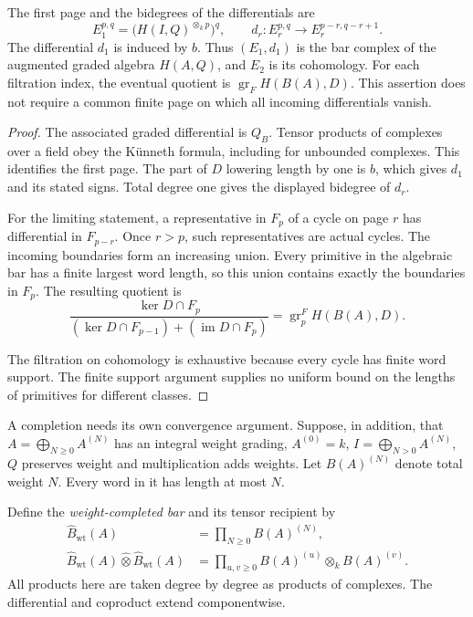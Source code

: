 \begin{proposition}
\label{prop:brst-length-sequence}
The first page and the bidegrees of the differentials are
\[
 E_1^{p,q}=\bigl(H(I,Q)^{\otimes_k p}\bigr)^q,
 \qquad
 d_r:E_r^{p,q}\longrightarrow E_r^{p-r,q-r+1}.
\]
The differential $d_1$ is induced by $b$.
Thus $(E_1,d_1)$ is the bar complex of the augmented graded algebra
$H(A,Q)$, and $E_2$ is its cohomology.
For each filtration index, the eventual quotient is
$\operatorname{gr}_F H(B(A),D)$.
This assertion does not require a common finite page on which
all incoming differentials vanish.
\end{proposition}
\begin{proof}
The associated graded differential is $Q_B$.
Tensor products of complexes over a field obey the K\"unneth
formula, including for unbounded complexes.
This identifies the first page.  The part of $D$ lowering length
by one is $b$, which gives $d_1$ and its stated signs.
Total degree one gives the displayed bidegree of $d_r$.

For the limiting statement, a representative in $F_p$ of a cycle
on page $r$ has differential in $F_{p-r}$.
Once $r>p$, such representatives are actual cycles.
The incoming boundaries form an increasing union.
Every primitive in the algebraic bar has a finite largest word
length, so this union contains exactly the boundaries in $F_p$.
The resulting quotient is
\[
 \frac{\ker D\cap F_p}
 { (\ker D\cap F_{p-1})+(\operatorname{im}D\cap F_p)}
 =\operatorname{gr}_p^F H(B(A),D).
\]

The filtration on cohomology is exhaustive because every cycle
has finite word support.
The finite support argument supplies no uniform bound on the
lengths of primitives for different classes.
\end{proof}

A completion needs its own convergence argument.
Suppose, in addition, that
$A=\bigoplus_{N\geq0}A^{(N)}$ has an integral weight grading,
$A^{(0)}=k$, $I=\bigoplus_{N>0}A^{(N)}$,
$Q$ preserves weight and multiplication adds weights.
Let $B(A)^{(N)}$ denote total weight $N$.
Every word in it has length at most $N$.

Define the \emph{weight-completed bar} and its tensor recipient by
\begin{align*}
 \widehat B_{\mathrm{wt}}(A)&=\prod_{N\geq0}B(A)^{(N)},\\
 \widehat B_{\mathrm{wt}}(A)\widehat\otimes
 \widehat B_{\mathrm{wt}}(A)
 &=\prod_{u,v\geq0}B(A)^{(u)}\otimes_k B(A)^{(v)}.
\end{align*}
All products here are taken degree by degree as products of
complexes.  The differential and coproduct extend componentwise.

